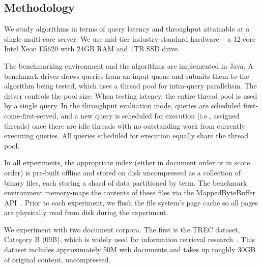 \subsection{Methodology}
\label{ssec:setup}

We study  algorithms in terms of query latency and throughput attainable at a single multi-core server. 
We use mid-tier industry-standard hardware -- a 12-core Intel Xeon E5620 with 24GB RAM and 1TB SSD drive. 

The benchmarking environment and the algorithms  are implemented in Java. 
A  {benchmark driver} draws queries from an input queue and submits them to the algorithm being tested, which
uses a thread pool for intra-query parallelism. 
The driver controls the pool size. %
When testing latency, the entire thread pool is used by a single query. 
In the throughput evaluation mode, queries are scheduled first-come-first-served, 
and a new query is scheduled for execution (i.e., assigned threads) 
once  there are idle threads with no outstanding work from currently executing queries.
All queries scheduled for execution equally share the thread pool.

In all experiments, the appropriate index (either in document order or in score order)
is pre-built offline and stored on disk uncompressed as a collection of binary files, 
each storing a shard of data partitioned by term.  The benchmark environment memory-maps the contents 
of these files via the MappedByteBuffer API~\cite{java-bytebuffer}.
Prior to each experiment, we flush the file system's page cache so all pages are physically read from disk during the experiment.



We  experiment with two document corpora. The first  is 
the TREC dataset, Category B ({\cw}09B), which is widely used for information retrieval research~\cite{ClueWeb09}. This dataset includes approximately 50M web documents and takes up roughly 30GB of original content, uncompressed.



